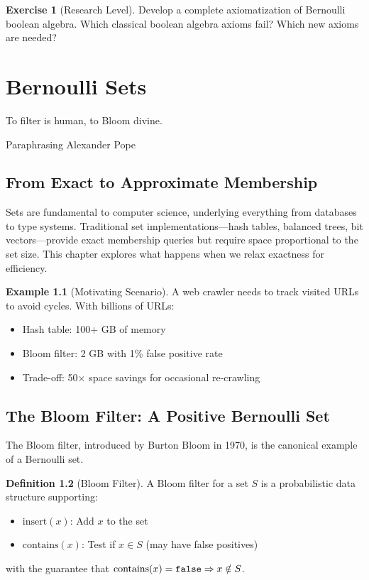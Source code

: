 \documentclass[11pt,twoside,openright]{book}
\theoremstyle{definition}
\newtheorem{definition}{Definition}[chapter]
\newtheorem{example}[definition]{Example}
\newtheorem{exercise}[definition]{Exercise}
\theoremstyle{plain}
\theoremstyle{remark}
\begin{document}
\begin{exercise}[Research Level]
Develop a complete axiomatization of Bernoulli boolean algebra. Which classical boolean algebra axioms fail? Which new axioms are needed?
\end{exercise}

\chapter{Bernoulli Sets}
\label{ch:bernoulli-sets}

\epigraph{To filter is human, to Bloom divine.}{Paraphrasing Alexander Pope}

\section{From Exact to Approximate Membership}

Sets are fundamental to computer science, underlying everything from databases to type systems. Traditional set implementations—hash tables, balanced trees, bit vectors—provide exact membership queries but require space proportional to the set size. This chapter explores what happens when we relax exactness for efficiency.

\begin{example}[Motivating Scenario]
A web crawler needs to track visited URLs to avoid cycles. With billions of URLs:
\begin{itemize}
    \item Hash table: 100+ GB of memory
    \item Bloom filter: 2 GB with 1\% false positive rate
    \item Trade-off: 50× space savings for occasional re-crawling
\end{itemize}
\end{example}

\section{The Bloom Filter: A Positive Bernoulli Set}

The Bloom filter, introduced by Burton Bloom in 1970, is the canonical example of a Bernoulli set.

\begin{definition}[Bloom Filter]
A Bloom filter for a set $S$ is a probabilistic data structure supporting:
\begin{itemize}
    \item $\text{insert}(x)$: Add $x$ to the set
    \item $\text{contains}(x)$: Test if $x \in S$ (may have false positives)
\end{itemize}
with the guarantee that $\text{contains}(x) = \mathtt{false} \Rightarrow x \notin S$.
\end{definition}
\end{document}
